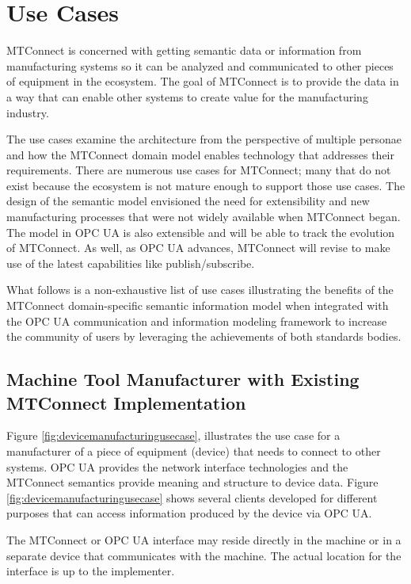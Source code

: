 \section{Use Cases}

MTConnect is concerned with getting semantic data or information from manufacturing systems so it can be analyzed and communicated to other pieces of equipment in the ecosystem. The goal of MTConnect is to provide the data in a way that can enable other systems to create value for the manufacturing industry. 

The use cases examine the architecture from the perspective of multiple personae and how the MTConnect domain model enables technology that addresses their requirements. There are numerous use cases for MTConnect; many that do not exist because the ecosystem is not mature enough to support those use cases. The design of the semantic model envisioned the need for extensibility and new manufacturing processes that were not widely available when MTConnect began. The model in OPC UA is also extensible and will be able to track the evolution of MTConnect. As well, as OPC UA advances, MTConnect will revise to make use of the latest capabilities like publish/subscribe.

What follows is a non-exhaustive list of use cases illustrating the benefits of the MTConnect domain-specific semantic information model when integrated with the OPC UA communication and information modeling framework to increase the community of users by leveraging the achievements of both standards bodies.

\subsection{Machine Tool Manufacturer with Existing MTConnect Implementation}

Figure \ref{fig:devicemanufacturingusecase}, illustrates the use case for a manufacturer of a piece of equipment (device) that needs to connect to other systems. OPC UA provides the network interface technologies and the MTConnect semantics provide meaning and structure to device data. Figure \ref{fig:devicemanufacturingusecase} shows several clients developed for different purposes that can access information produced by the device via OPC UA.



The MTConnect or OPC UA interface may reside directly in the machine or in a separate device that communicates with the machine. The actual location for the interface is up to the implementer.

